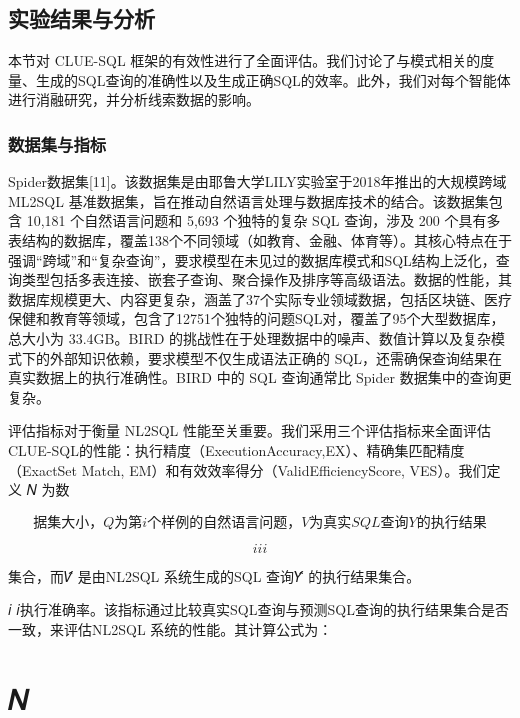 \documentclass[12pt,a4paper,openright,UTF8]{ctexbook}
\begin{document}
\section{实验结果与分析}

本节对 CLUE-SQL 框架的有效性进行了全面评估。我们讨论了与模式相关的度量、生成的SQL查询的准确性以及生成正确SQL的效率。此外，我们对每个智能体进行消融研究，并分析线索数据的影响。

\subsection{数据集与指标}

Spider数据集[11]。该数据集是由耶鲁大学LILY实验室于2018年推出的大规模跨域 ML2SQL 基准数据集，旨在推动自然语言处理与数据库技术的结合。该数据集包含 10,181 个自然语言问题和 5,693 个独特的复杂 SQL 查询，涉及 200 个具有多表结构的数据库，覆盖138个不同领域（如教育、金融、体育等）。其核心特点在于强调“跨域”和“复杂查询”，要求模型在未见过的数据库模式和SQL结构上泛化，查询类型包括多表连接、嵌套子查询、聚合操作及排序等高级语法。数据的性能，其数据库规模更大、内容更复杂，涵盖了37个实际专业领域数据，包括区块链、医疗保健和教育等领域，包含了12751个独特的问题SQL对，覆盖了95个大型数据库，总大小为 33.4GB。BIRD 的挑战性在于处理数据中的噪声、数值计算以及复杂模式下的外部知识依赖，要求模型不仅生成语法正确的 SQL，还需确保查询结果在真实数据上的执行准确性。BIRD 中的 SQL 查询通常比 Spider 数据集中的查询更复杂。


评估指标对于衡量 NL2SQL 性能至关重要。我们采用三个评估指标来全面评估CLUE-SQL的性能：执行精度（ExecutionAccuracy,EX）、精确集匹配精度（ExactSet Match, EM）和有效效率得分（ValidEfficiencyScore, VES）。我们定义 𝑁 为数

\begin{equation}
据集大小，Q 为第 i 个样例的自然语言问题，V 为真实 SQL 查询 Y 的执行结果
\end{equation}


\begin{equation}
i i i
\end{equation}

集合，而𝑉̂ 是由NL2SQL 系统生成的SQL 查询𝑌̂ 的执行结果集合。


𝑖 𝑖执行准确率。该指标通过比较真实SQL查询与预测SQL查询的执行结果集合是否一致，来评估NL2SQL 系统的性能。其计算公式为：

\chapter{𝑁}
\end{document}
